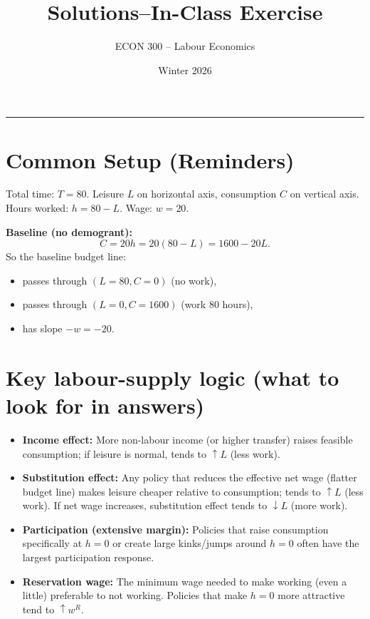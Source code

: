 \documentclass[12pt]{article}
\title{Solutions--In-Class Exercise}
\author{ECON 300 -- Labour Economics}
\date{Winter 2026}
\begin{document}
\maketitle
\hrule



\vspace{1em}

\section*{Common Setup (Reminders)}

Total time: \(T=80\). Leisure \(L\) on horizontal axis, consumption \(C\) on vertical axis.\\
Hours worked: \(h = 80 - L\). Wage: \(w = 20\).

\textbf{Baseline (no demogrant):}
\[
C = 20h = 20(80-L) = 1600 - 20L.
\]
So the baseline budget line:
\begin{itemize}
\item passes through \((L=80, C=0)\) (no work),
\item passes through \((L=0, C=1600)\) (work 80 hours),
\item has slope \(-w = -20\).
\end{itemize}

\section*{Key labour-supply logic (what to look for in answers)}

\begin{itemize}
\item \textbf{Income effect:} More non-labour income (or higher transfer) raises feasible consumption; if leisure is normal, tends to \(\uparrow L\) (less work).
\item \textbf{Substitution effect:} Any policy that reduces the effective net wage (flatter budget line) makes leisure cheaper relative to consumption; tends to \(\uparrow L\) (less work). If net wage increases, substitution effect tends to \(\downarrow L\) (more work).
\item \textbf{Participation (extensive margin):} Policies that raise consumption specifically at \(h=0\) or create large kinks/jumps around \(h=0\) often have the largest participation response.
\item \textbf{Reservation wage:} The minimum wage needed to make working (even a little) preferable to not working. Policies that make \(h=0\) more attractive tend to \(\uparrow w^R\).
\end{itemize}
\end{document}

